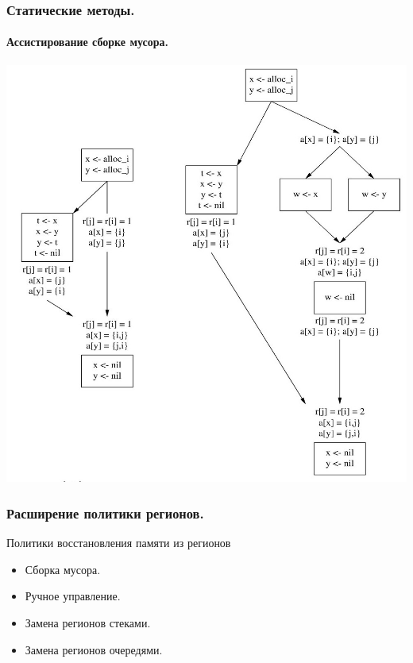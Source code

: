 \documentclass[ucs]{beamer}
\begin{document}
\begin{frame}
  \frametitle{Статические методы.}
  \framesubtitle{Ассистирование сборке мусора.}

  \begin{center}
    \includegraphics[height=0.79\textheight]{pic/ifgraphs_p.jpg}
  \end{center}

\end{frame}

\begin{frame}
  \frametitle{Расширение политики регионов.}
  
  \begin{block}{Политики восстановления памяти из регионов}
    \begin{itemize}
    \item Сборка мусора.
    \item Ручное управление.
    \item Замена регионов стеками.
    \item Замена регионов очередями.
    \end{itemize}
  \end{block}
\end{frame}

\end{document}
